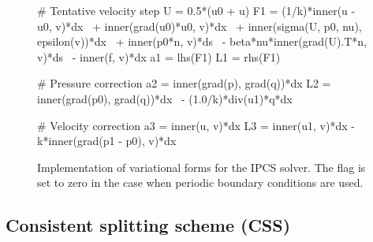 \begin{figure}
  \begin{center}
    \begin{python}
# Tentative velocity step
U = 0.5*(u0 + u)
F1 = (1/k)*inner(u - u0, v)*dx \
   + inner(grad(u0)*u0, v)*dx \
   + inner(sigma(U, p0, nu), epsilon(v))*dx \
   + inner(p0*n, v)*ds \
   - beta*nu*inner(grad(U).T*n, v)*ds \
   - inner(f, v)*dx
a1 = lhs(F1)
L1 = rhs(F1)

# Pressure correction
a2 = inner(grad(p), grad(q))*dx
L2 = inner(grad(p0), grad(q))*dx \
   - (1.0/k)*div(u1)*q*dx

# Velocity correction
a3 = inner(u, v)*dx
L3 = inner(u1, v)*dx - k*inner(grad(p1 - p0), v)*dx
    \end{python}
    \caption{Implementation of variational forms for the IPCS
      solver. The flag  is set to zero in the case when
      periodic boundary conditions are used.}
    \label{fig:IPCS}
  \end{center}
\end{figure}

\subsection{Consistent splitting scheme (CSS)}
\label{sec:css}

